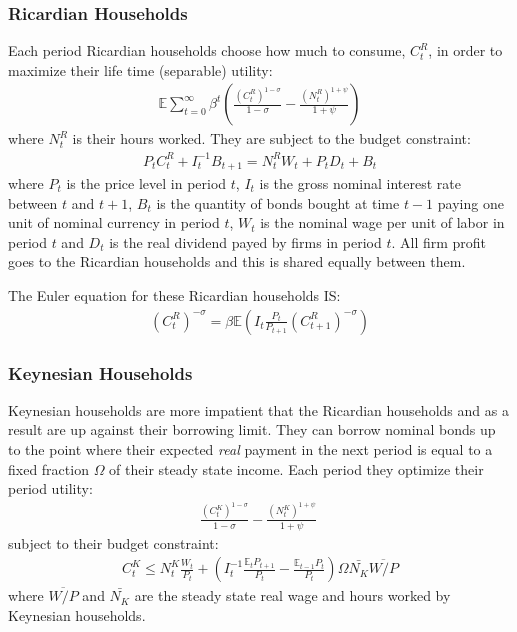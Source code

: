 \documentclass[titlepage]{\econtex}\newcommand{\texname}{ConsumptionHeterogeneity}
\begin{document}
\subsubsection{Ricardian Households}
Each period Ricardian households choose how much to consume, $C^R_t$, in order to maximize their life time (separable) utility:
\begin{align*}
\mathbb{E}\sum_{t=0}^{\infty}\beta^t \left(\frac{\left(C^R_t\right)^{1-\sigma}}{1-\sigma} - \frac{\left(N^R_t\right)^{1+\psi}}{1+\psi}\right)
\end{align*}
where $N^R_t$ is their hours worked. They are subject to the budget constraint:
\begin{align*}
P_t C^R_t + I_{t}^{-1}B_{t+1} =  N^R_t W_t + P_t D_t + B_t
\end{align*}
where $P_t$ is the price level in period $t$, $I_t$ is the gross nominal interest rate between $t$ and $t+1$, $B_t$ is the quantity of bonds bought at time $t-1$ paying one unit of nominal currency in period $t$, $W_t$ is the nominal wage per unit of labor in period $t$ and $D_t$ is the real dividend payed by firms in period $t$. All firm profit goes to the Ricardian households and this is shared equally between them.

The Euler equation for these Ricardian households IS:
\begin{align}
\left(C^R_t\right)^{-\sigma} = \beta \mathbb{E}\left(I_t\frac{P_{t}}{P_{t+1}} \left(C^R_{t+1}\right)^{-\sigma}\right)	\label{euler_R}
\end{align}

\subsubsection{Keynesian Households}
Keynesian households are more impatient that the Ricardian households and as a result are up against their borrowing limit. They can borrow nominal bonds up to the point where their expected \textit{real} payment in the next period is equal to a fixed fraction $\Omega$ of their steady state income. Each period they optimize their period utility:
\begin{align*}
\frac{\left(C^K_t\right)^{1-\sigma}}{1-\sigma} - \frac{\left(N^K_t\right)^{1+\psi}}{1+\psi}\
\end{align*}
subject to their budget constraint:
\begin{align}
C^K_t \leq N^K_t \frac{W_t}{P_t} + \left(I_{t}^{-1} \frac{\mathbb{E}_t P_{t+1}}{P_t} -  \frac{\mathbb{E}_{t-1}P_t }{P_t}\right)\Omega \bar{N_K}\overline{W/P}  \label{budget_constraint_K}
\end{align}
where $\overline{W/P}$ and $\bar{N_K}$ are the steady state real wage and hours worked by Keynesian households.
\end{document}
